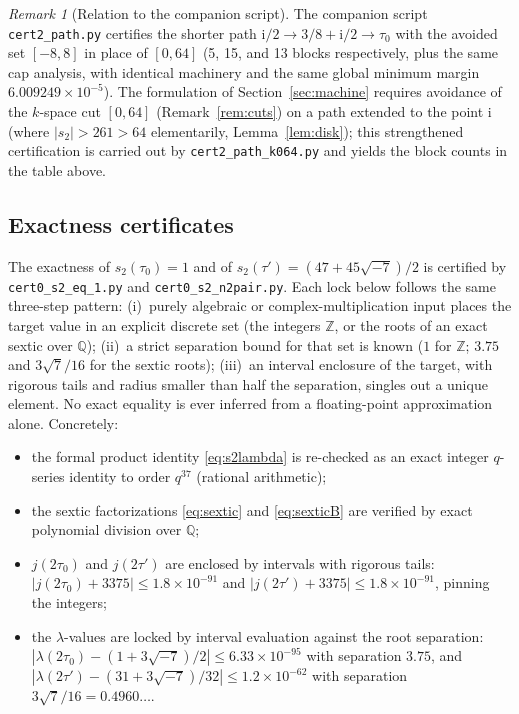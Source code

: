 \documentclass[11pt]{article}
\theoremstyle{definition}
\theoremstyle{remark}
\newtheorem{remark}[theorem]{Remark}
\newcommand{\Qq}{\mathbb{Q}}
\newcommand{\Zz}{\mathbb{Z}}
\newcommand{\ii}{\mathrm{i}}
\begin{document}
\begin{remark}[Relation to the companion script]
The companion script \texttt{cert2\_path.py} certifies the shorter path
$\ii/2\to3/8+\ii/2\to\tau_0$ with the avoided set $[-8,8]$ in place of
$[0,64]$ (5, 15, and 13 blocks respectively, plus the same cap analysis,
with identical machinery and the same global minimum margin
$6.009249\times10^{-5}$). The formulation of Section~\ref{sec:machine}
requires avoidance of the $k$-space cut $[0,64]$ (Remark~\ref{rem:cuts})
on a path extended to the point $\ii$ (where $|s_2|>261>64$ elementarily,
Lemma~\ref{lem:disk}); this strengthened certification is carried out by
\texttt{cert2\_path\_k064.py} and yields the block counts in the table
above.
\end{remark}

\subsection{Exactness certificates}

The exactness of $s_2(\tau_0)=1$ and of
$s_2(\tau')=(47+45\sqrt{-7})/2$ is certified by
\texttt{cert0\_s2\_eq\_1.py} and \texttt{cert0\_s2\_n2pair.py}.
Each lock below follows the same three-step pattern: (i)~purely
algebraic or complex-multiplication input places the target value in an
explicit discrete set (the integers $\Zz$, or the roots of an exact
sextic over $\Qq$); (ii)~a strict separation bound for that set is known
($1$ for $\Zz$; $3.75$ and $3\sqrt7/16$ for the sextic roots);
(iii)~an interval enclosure of the target, with rigorous tails and
radius smaller than half the separation, singles out a unique element.
No exact equality is ever inferred from a floating-point approximation
alone. Concretely:
\begin{itemize}
\item the formal product identity \eqref{eq:s2lambda} is re-checked as an
  exact integer $q$-series identity to order $q^{37}$ (rational
  arithmetic);
\item the sextic factorizations \eqref{eq:sextic} and \eqref{eq:sexticB}
  are verified by exact polynomial division over $\Qq$;
\item $j(2\tau_0)$ and $j(2\tau')$ are enclosed by intervals with
  rigorous tails: $|j(2\tau_0)+3375|\le1.8\times10^{-91}$ and
  $|j(2\tau')+3375|\le1.8\times10^{-91}$, pinning the integers;
\item the $\lambda$-values are locked by interval evaluation against the
  root separation: $|\lambda(2\tau_0)-(1+3\sqrt{-7})/2|\le
  6.33\times10^{-95}$ with
  separation $3.75$, and
  $|\lambda(2\tau')-(31+3\sqrt{-7})/32|\le1.2\times10^{-62}$ with
  separation $3\sqrt7/16=0.4960\ldots$.
\end{itemize}
\end{document}
